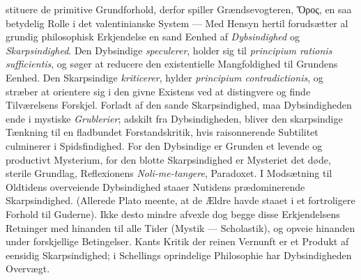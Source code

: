 \documentclass[12pt]{book}
\begin{document}
stituere de primitive Grundforhold, derfor spiller Grændsevogteren, Ὅρος, en saa
betydelig Rolle i det valentinianske System --- Med Hensyn hertil forudsætter al
grundig philosophisk Erkjendelse en sand Eenhed af \emph{Dybsindighed} og
\emph{Skarpsindighed}. Den Dybsindige \emph{speculerer}, holder sig til
\textit{principium rationis sufficientis}, og søger at reducere den existentielle
Mangfoldighed til Grundens Eenhed. Den Skarpsindige \emph{kriticerer}, hylder
\textit{principium contradictionis}, og stræber at orientere sig i den givne Existens
ved at distingvere og finde Tilværelsens Forskjel. Forladt af den sande
Skarpsindighed, maa Dybsindigheden ende i mystiske \emph{Grublerier}; adskilt fra
Dybsindigheden, bliver den skarpsindige Tænkning til en fladbundet Forstandskritik,
hvis raisonnerende Subtilitet culminerer i Spidsfindighed. For den Dybsindige er
Grunden et levende og productivt Mysterium, for den blotte Skarpsindighed er
Mysteriet det døde, sterile Grundlag, Reflexionens \textit{Noli-me-tangere},
Paradoxet. I Modsætning til Oldtidens overveiende Dybsindighed staaer Nutidens
prædominerende Skarpsindighed. (Allerede Plato meente, at de Ældre havde staaet i et
fortroligere Forhold til Guderne). Ikke desto mindre afvexle dog begge disse
Erkjendelsens Retninger med hinanden til alle Tider (Mystik --- Scholastik), og
opveie hinanden under forskjellige Betingelser. Kants Kritik der reinen Vernunft er
et Produkt af eensidig Skarpsindighed; i Schellings oprindelige Philosophie har
Dybsindigheden Overvægt.
\end{document}
